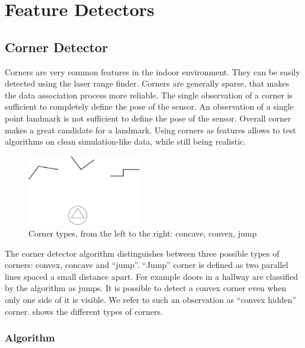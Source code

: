 

\section{Feature Detectors}

\subsection{Corner Detector}

Corners are very common features in the indoor environment. They can
be easily detected using the laser range finder. Corners are generally
sparse, that makes the data association process more reliable. The
single observation of a corner is sufficient to completely define the
pose of the sensor. An observation of a single point landmark is not
sufficient to define the pose of the sensor. Overall corner makes a
great candidate for a landmark. Using corners as features allows to
test algorithms on clean simulation-like data, while still being
realistic.


\begin{figure}[htbp]
  \centering
  \includegraphics[width=5cm]{Pics/fig_corner_types}
  \caption{Corner types, from the left to the right: concave, convex,
  jump}
  \label{fig:corner_types}
\end{figure}

The corner detector algorithm distinguishes between three possible
types of corners: convex, concave and ``jump''. ``Jump'' corner is
defined as two parallel lines spaced a small distance apart. For
example doors in a hallway are classified by the algorithm as jumps.
It is possible to detect a convex corner even when only one side of it
is visible. We refer to such an observation as ``convex hidden''
corner.  shows the different types of
corners.


\subsubsection{Algorithm}

